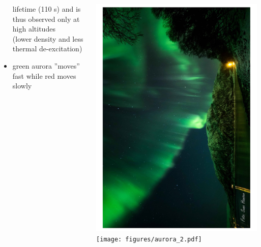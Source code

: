 \documentclass[mathserif,8pt]{beamer}
\begin{document}
\begin{frame}
\begin{columns}
\begin{column}{.70\textwidth}
\begin{itemize}
		lifetime (110 s) and is thus observed only at high altitudes\\
		(lower density and less thermal de-excitation)
	\item	green aurora ''moves'' fast while red moves slowly
	\end{itemize}
    \end{column}
    \begin{column}{.30\textwidth}
	\includegraphics[viewport = 0 0 600 800, clip, scale=0.12, angle = -90]{figures/aurora.pdf}\\
	\texttt{[image: figures/aurora\_2.pdf]}\\

\end{column}
\end{columns}
\end{frame}
\end{document}
